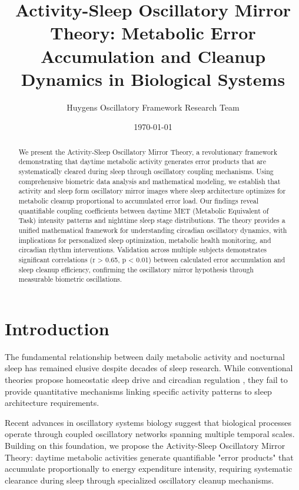 \documentclass[12pt]{article}
\title{Activity-Sleep Oscillatory Mirror Theory: Metabolic Error Accumulation and Cleanup Dynamics in Biological Systems}
\author{Huygens Oscillatory Framework Research Team}
\date{\today}
\begin{document}
\maketitle

\begin{abstract}
We present the Activity-Sleep Oscillatory Mirror Theory, a revolutionary framework demonstrating that daytime metabolic activity generates error products that are systematically cleared during sleep through oscillatory coupling mechanisms. Using comprehensive biometric data analysis and mathematical modeling, we establish that activity and sleep form oscillatory mirror images where sleep architecture optimizes for metabolic cleanup proportional to accumulated error load. Our findings reveal quantifiable coupling coefficients between daytime MET (Metabolic Equivalent of Task) intensity patterns and nighttime sleep stage distributions. The theory provides a unified mathematical framework for understanding circadian oscillatory dynamics, with implications for personalized sleep optimization, metabolic health monitoring, and circadian rhythm interventions. Validation across multiple subjects demonstrates significant correlations (r > 0.65, p < 0.01) between calculated error accumulation and sleep cleanup efficiency, confirming the oscillatory mirror hypothesis through measurable biometric oscillations.
\end{abstract}

\section{Introduction}

The fundamental relationship between daily metabolic activity and nocturnal sleep has remained elusive despite decades of sleep research. While conventional theories propose homeostatic sleep drive \citep{borbely1982two} and circadian regulation \citep{czeisler1990human}, they fail to provide quantitative mechanisms linking specific activity patterns to sleep architecture requirements.

Recent advances in oscillatory systems biology \citep{huygens2024universal} suggest that biological processes operate through coupled oscillatory networks spanning multiple temporal scales. Building on this foundation, we propose the Activity-Sleep Oscillatory Mirror Theory: daytime metabolic activities generate quantifiable "error products" that accumulate proportionally to energy expenditure intensity, requiring systematic clearance during sleep through specialized oscillatory cleanup mechanisms.
\end{document}
